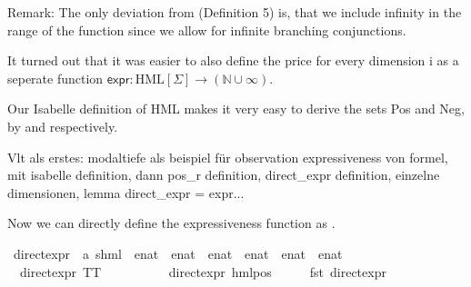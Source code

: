 \begin{isabellebody}
\begin{isamarkuptext}
Remark: The only deviation from \cite{bisping2023process} (Definition 5) is, that we include infinity in the range of the function since we allow for infinite branching conjunctions.

It turned out that it was easier to also define the price for every dimension i as a seperate function $\textsf{expr} : \text{HML}[\Sigma] \rightarrow (\mathbb{N \cup \infty})$.%
\end{isamarkuptext}\isamarkuptrue%
%
\begin{isamarkuptext}%
Our Isabelle definition of HML makes it very easy to derive the sets Pos and Neg, by  and  respectively.%
\end{isamarkuptext}\isamarkuptrue%
%
\begin{isamarkuptext}%
Vlt als erstes: modaltiefe als beispiel für observation expressiveness von formel, mit isabelle definition,
dann pos\_r definition,
direct\_expr definition,
einzelne dimensionen,
lemma direct\_expr = expr...%
\end{isamarkuptext}\isamarkuptrue%
%
\begin{isamarkuptext}%
Now we can directly define the expressiveness function as .%
\end{isamarkuptext}\isamarkuptrue%
\isamarkupfalse%
\ direct{\isacharunderscore}{\kern0pt}expr\ {\isacharcolon}{\kern0pt}{\isacharcolon}{\kern0pt}\ {\isachardoublequoteopen}{\isacharparenleft}{\kern0pt}{\isacharprime}{\kern0pt}a{\isacharcomma}{\kern0pt}\ {\isacharprime}{\kern0pt}s{\isacharparenright}{\kern0pt}hml\ {\isasymRightarrow}\ enat\ {\isasymtimes}\ enat\ {\isasymtimes}\ enat\ {\isasymtimes}\ enat\ {\isasymtimes}\ enat\ {\isasymtimes}\ enat{\isachardoublequoteclose}\ \isanewline
\ \ {\isachardoublequoteopen}direct{\isacharunderscore}{\kern0pt}expr\ TT\ {\isacharequal}{\kern0pt}\ {\isacharparenleft}{\kern0pt}{}{\isacharcomma}{\kern0pt}\ {}{\isacharcomma}{\kern0pt}\ {}{\isacharcomma}{\kern0pt}\ {}{\isacharcomma}{\kern0pt}\ {}{\isacharcomma}{\kern0pt}\ {}{\isacharparenright}{\kern0pt}{\isachardoublequoteclose}\ {\isacharbar}{\kern0pt}\isanewline
\ \ {\isachardoublequoteopen}direct{\isacharunderscore}{\kern0pt}expr\ {\isacharparenleft}{\kern0pt}hml{\isacharunderscore}{\kern0pt}pos\ {\isasymalpha}\ {\isasymphi}{\isacharparenright}{\kern0pt}\ {\isacharequal}{\kern0pt}\ {\isacharparenleft}{\kern0pt}{}\ {\isacharplus}{\kern0pt}\ fst\ {\isacharparenleft}{\kern0pt}direct{\isacharunderscore}{\kern0pt}expr\ {\isasymphi}{\isacharparenright}{\kern0pt}{\isacharcomma}{\kern0pt}\ \isanewline

\end{isabellebody}
